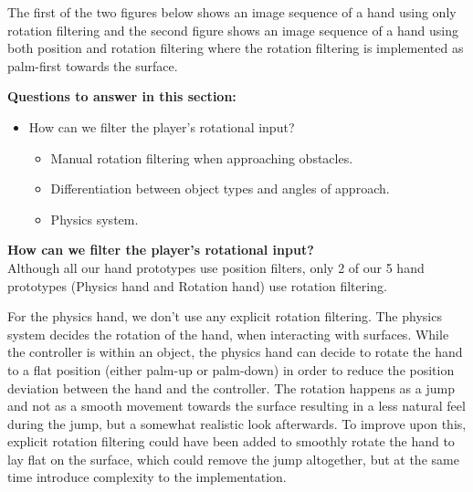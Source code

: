 The first of the two figures below shows an image sequence of a hand using only rotation filtering and the second figure shows an image sequence of a hand using both position and rotation filtering where the rotation filtering is implemented as palm-first towards the surface.


\textbf{Questions to answer in this section:}
\begin{itemize}
\setlength\itemsep{-0.1cm}
\item How can we filter the player's rotational input?
\begin{itemize}
\setlength\itemsep{-0.1cm}
\item Manual rotation filtering when approaching obstacles.
\item Differentiation between object types and angles of approach.
\item Physics system.
\end{itemize}
\end{itemize}


\textbf{How can we filter the player's rotational input?}\\
Although all our hand prototypes use position filters, only 2 of our 5 hand prototypes (Physics hand and Rotation hand) use rotation filtering.

For the physics hand, we don't use any explicit rotation filtering. The physics system decides the rotation of the hand, when interacting with surfaces. While the controller is within an object, the physics hand can decide to rotate the hand to a flat position (either palm-up or palm-down) in order to reduce the position deviation between the hand and the controller. The rotation happens as a jump and not as a smooth movement towards the surface resulting in a less natural feel during the jump, but a somewhat realistic look afterwards. To improve upon this, explicit rotation filtering could have been added to smoothly rotate the hand to lay flat on the surface, which could remove the jump altogether, but at the same time introduce complexity to the implementation.


